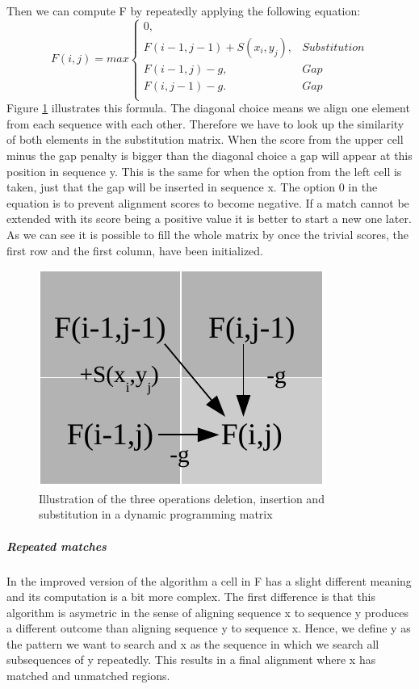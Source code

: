 Then we can compute F by repeatedly applying the following equation:
\begin{equation}
F(i,j) = max \left\{ \begin{array}{lr}0,&\\F(i-1,j-1)+S(x_i,y_j),&Substitution\\F(i-1,j)-g,&Gap\\F(i,j-1)-g.&Gap\\\end{array} \right. 
\end{equation}
Figure \ref{fig:basicalignmentoperations} illustrates this formula. The diagonal choice means we align one element from each sequence with each other. Therefore we have to look up the similarity of both elements in the substitution matrix. 
When the score from the upper cell minus the gap penalty is bigger than the diagonal choice a gap will appear at this position in sequence y. 
This is the same for when the option from the left cell is taken, just that the gap will be inserted in sequence x. 
The option 0 in the equation is to prevent alignment scores to become negative. 
If a match cannot be extended with its score being a positive value it is better to start a new one later. 
As we can see it is possible to fill the whole matrix by once the trivial scores, the first row and the first column, have been initialized.

\begin{figure}
	\centering
	\includegraphics{img/basic_cell_fill.pdf}
	\caption{Illustration of the three operations deletion, insertion and substitution in a dynamic programming matrix}
	\label{fig:basicalignmentoperations}
\end{figure}

\subparagraph{Repeated matches}
In the improved version of the algorithm a cell in F has a slight different meaning and its computation is a bit more complex. 
The first difference is that this algorithm is asymetric in the sense of aligning sequence x to sequence y produces a different outcome than aligning sequence y to sequence x. Hence, we define y as the pattern we want to search and x as the sequence in which we search all subsequences of y repeatedly.
This results in a final alignment where x has matched and unmatched regions.  

